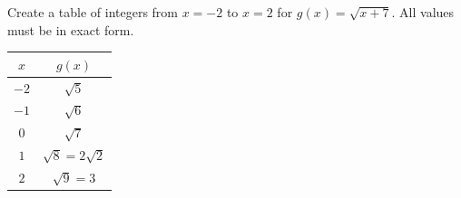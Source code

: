 \begin{solution}[title=Solution 4]
    Create a table of integers from $x = -2$ to $x = 2$ for $g(x) = \sqrt{x + 7}$. All values must be in exact form.
    \begin{center}
        \begin{tabular}{ c | c }
            $x$ & $g(x)$ \\
            \hline
            $-2$ & $\sqrt{5}$ \\
            \hline
            $-1$ & $\sqrt{6}$ \\
            \hline
            $0$ & $\sqrt{7}$ \\
            \hline
            $1$ & $\sqrt{8} = 2\sqrt{2}$ \\
            \hline
            $2$ & $\sqrt{9} = 3$
        \end{tabular}
    \end{center}
\end{solution}
\clearpage
